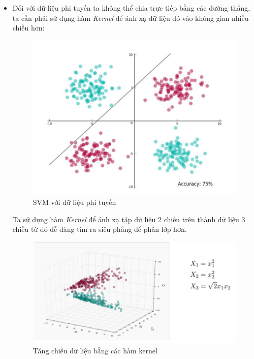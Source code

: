 \begin{itemize}
    \item Đối với dữ liệu phi tuyến ta không thể chia trực tiếp bằng các đường thẳng, ta cần phải sử dụng hàm \textit{Kernel} để ánh xạ dữ liệu đó vào không gian nhiều chiều hơn:
    \begin{figure}[H]
        \begin{center}
            \includegraphics[scale=0.3]{images/theo3/SVM-kernel-1}
            \caption{SVM với dữ liệu phi tuyến}
        \end{center}
    \end{figure}
    \subitem Ta sử dụng hàm \textit{Kernel} để ánh xạ tập dữ liệu 2 chiều trên thành dữ liệu 3 chiều từ đó dễ dàng tìm ra siêu phẳng để phân lớp hơn.
    \begin{figure}[H]
        \begin{center}
            \includegraphics[scale=0.3]{images/theo3/SVM-kernel-2}
            \caption{Tăng chiều dữ liệu bằng các hàm kernel}
        \end{center}
    \end{figure}
\end{itemize}

